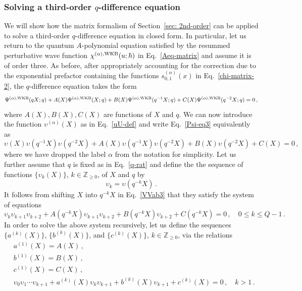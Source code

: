 \documentclass[a4paper,11pt]{article}
\theoremstyle{definition}
\def\IZ{{\mathbb Z}}
\def\u{\upsilon}
\newcommand{\be}{\begin{equation}}
\newcommand{\ee}{\end{equation}}
\begin{document}
\subsubsection{Solving a third-order $q$-difference equation} \label{sec: 3rd-order}
We will show how the matrix formalism of Section~\ref{sec: 2nd-order} can be applied to solve a third-order $q$-difference equation in closed form. 
In particular, let us return to the quantum $A$-polynomial equation satisfied by the resummed perturbative wave function $\chi^{(\alpha), \rm{WKB}}(u; \hbar)$ in Eq.~\eqref{Aeq-matrix} and assume it is of order three.
As before, after appropriately accounting for the correction due to the exponential prefactor containing the functions $s^{(\alpha)}_{0,1}(x)$ in Eq.~\eqref{chi-matrix-2}, the $q$-difference equation takes the form 
%
\be
\label{Psi-eq3}
\Psi^{(\alpha), \rm{WKB}}(q X;q)+A(X)\Psi^{(\alpha), \rm{WKB}}(X;q)+B(X)\Psi^{(\alpha), \rm{WKB}}(q^{-1} X;q) +C(X)\Psi^{(\alpha), \rm{WKB}}(q^{-2} X;q)=0 \, ,
\ee
%
where $A(X), B(X), C(X)$ are functions of $X$ and $q$. We can now introduce the function $\u^{(\alpha)}(X)$ as in Eq.~\eqref{uU-def} and write Eq.~\eqref{Psi-eq3} equivalently as
%
\be \label{VVab3}
\upsilon (X) \upsilon(q^{-1} X) \upsilon(q^{-2} X) + A(X) \upsilon(q^{-1} X)\upsilon(q^{-2} X) + B(X) \upsilon(q^{-2} X) + C(X) = 0 \, ,
\ee
where we have dropped the label $\alpha$ from the notation for simplicity.
Let us further assume that $q$ is fixed as in Eq.~\eqref{q-rat} and define the the sequence of functions $\{\upsilon_k(X) \}$, $k \in \IZ_{\ge 0}$, of $X$ and $q$ by
\be
\upsilon_k = \upsilon (q^{-k} X) \, .
\ee
It follows from shifting $X$ into $q^{-k}X$ in Eq.~\eqref{VVab3} that they satisfy the system of equations
\be \label{vkvk13}
\u_k \u_{k+1} \u_{k+2} + A(q^{-k} X) \u_{k+1} \u_{k+2} + B(q^{-k} X) \u_{k+2} + C(q^{-k} X) = 0 \, , \quad 0 \le k \le Q-1 \, .
\ee
In order to solve the above system recursively, let us define the sequences $\{ a^{(k)}(X)\}$, $\{b^{(k)}(X)\}$, and $\{c^{(k)}(X)\}$, $k \in \IZ_{\ge 0}$, via the relations
\begin{subequations} \label{ABvprods3}
\begin{align}
&a^{(1)}(X) = A(X) \, , \\
&b^{(1)}(X) = B(X) \, , \\
&c^{(1)}(X) = C(X) \, , \\
&\u_0 \u_1 \cdots \u_{k+1} + a^{(k)}(X) \u_k \u_{k+1} + b^{(k)}(X) \u_{k+1} + c^{(k)}(X)=0 \, , \quad k>1 \, . \label{ABvprods3-last}
\end{align}
\end{subequations}
\end{document}
